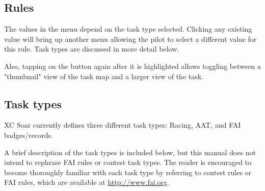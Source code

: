 \subsection*{Rules}
The values in the  menu depend on the task type selected.  Clicking any existing value will bring up another menu allowing the pilot to select a different value for this rule.  Task types are discussed in more detail below.

Also, tapping on the  button again after it is highlighted allows toggling between a "thumbnail" view of the task map and a larger view of the task.

\subsection*{Task types}
XC Soar currently defines three different task types: Racing, AAT, and FAI badges/records.

A brief description of the task types is included below, but this manual does not intend to rephrase FAI rules or contest task types.  The reader is encouraged to become thoroughly familiar with each task type by referring to contest rules or FAI rules, which are available at \url{http://www.fai.org}. 

